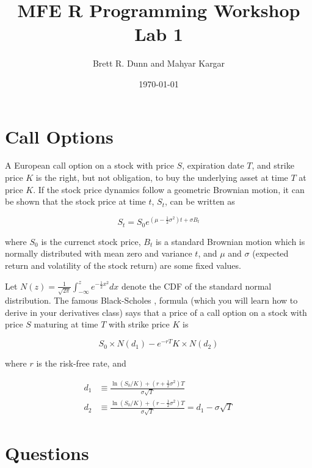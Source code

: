 \documentclass[12pt]{article}
\title{MFE R Programming Workshop Lab 1}
\date{\today}
\author{Brett R. Dunn and Mahyar Kargar}
\begin{document}
\maketitle
\onehalfspacing
\section*{Call Options}
A European call option on a stock with price $S$, expiration date $T$, and strike price $K$
is the right, but not obligation, to buy the underlying asset at time $T$ at price $K$. 
If the stock price dynamics follow a geometric Brownian motion, it can be shown that the stock price at time $t$, $S_t$, can be written as

\[
S_t = S_0 e^{\left(\mu-\frac{1}{2} \sigma^2 \right) t + \sigma B_t}
\]

where $S_0$ is the currenct stock price, $B_t$ is a standard Brownian motion which is normally distributed with mean zero and variance $t$, and $\mu$ and
$\sigma$ (expected return and volatility of the stock return) are some fixed values.

Let $N(z) = \frac{1}{\sqrt{2 \pi}} \int_{-\infty}^z e^{-\frac{1}{2}
  x^2}dx$ denote the CDF of the standard normal distribution. The
famous Black-Scholes \citep{black1973pricing,merton1973theory},
formula (which you will learn how to
derive in your derivatives class) says that a price of a call option
on a stock with price $S$ maturing at time $T$ with strike price $K$ is

\[
S_0 \times N(d_1) - e^{-rT} K \times N(d_2)
\]

where $r$ is the risk-free rate, and

\begin{align*}
  d_1 &\equiv \frac{\ln(S_0 / K) + \left(r + \frac{1}{2} \sigma^2 \right)
    T}{\sigma \sqrt{T}} \\
  d_2 &\equiv \frac{\ln(S_0 / K) + \left(r - \frac{1}{2} \sigma^2 \right)
    T}{\sigma \sqrt{T}} = d_1-\sigma\sqrt{T}
\end{align*}

\section*{Questions}
\end{document}
